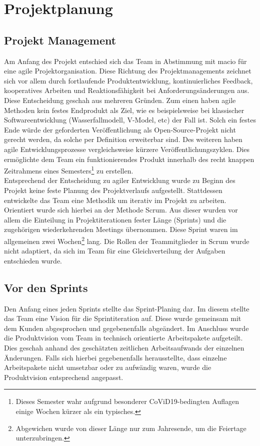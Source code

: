 \documentclass[10pt, a4paper]{article}
\begin{document}
\section{Projektplanung}

\subsection{Projekt Management}
Am Anfang des Projekt entschied sich das Team in Abstimmung mit macio für eine agile Projektorganisation.
Diese Richtung des Projektmanagements zeichnet sich vor allem durch fortlaufende Produktentwicklung, kontinuierliches Feedback, kooperatives Arbeiten und Reaktionsfähigkeit bei Anforderungsänderungen aus.
Diese Entscheidung geschah aus mehreren Gründen.
Zum einen haben agile Methoden kein festes Endprodukt als Ziel, wie es beispielsweise bei klassischer Softwareentwicklung (Wasserfallmodell, V-Model, etc) der Fall ist.
Solch ein festes Ende würde der geforderten Veröffentlichung als Open-Source-Projekt nicht gerecht werden, da solche per Definition erweiterbar sind.
Des weiteren haben agile Entwicklungsprozesse vergleichsweise kürzere Veröffentlichungszyklen.
Dies ermöglichte dem Team ein funktionierendes Produkt innerhalb des recht knappen Zeitrahmens eines Semesters\footnote{Dieses Semester wahr aufgrund besonderer CoViD19-bedingten Auflagen einige Wochen kürzer als ein typisches.} zu erstellen.
\\
Entsprechend der Entscheidung zu agiler Entwicklung wurde zu Beginn des Projekt keine feste Planung des Projektverlaufs aufgestellt.
Stattdessen entwickelte das Team eine Methodik um iterativ im Projekt zu arbeiten.
Orientiert wurde sich hierbei an der Methode Scrum.
Aus dieser wurden vor allem die Einteilung in Projektiterationen fester Länge (Sprints) und die zugehörigen wiederkehrenden Meetings übernommen.
Diese Sprint waren im allgemeinen zwei Wochen\footnote{Abgewichen wurde von dieser Länge nur zum Jahresende, um die Feiertage unterzubringen.} lang.
Die Rollen der Teammitglieder in Scrum wurde nicht adaptiert, da sich im Team für eine Gleichverteilung der Aufgaben entschieden wurde.

\subsection{Vor den Sprints}
Den Anfang eines jeden Sprints stellte das Sprint-Planing dar.
Im diesem stellte das Team eine Vision für die Sprintiteration auf.
Diese wurde gemeinsam mit dem Kunden abgesprochen und gegebenenfalls abgeändert.
Im Anschluss wurde die Produktvision vom Team in technisch orientierte Arbeitspakete aufgeteilt.
Dies geschah anhand des geschätzten zeitlichen Arbeitsaufwands der einzelnen Änderungen.
Falls sich hierbei gegebenenfalls herausstellte, dass einzelne Arbeitspakete nicht umsetzbar oder zu aufwändig waren, wurde die Produktvision entsprechend angepasst.
\end{document}
